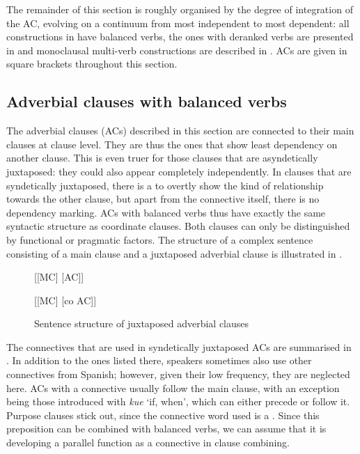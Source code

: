 The remainder of this section is roughly organised by the degree of integration of the AC, evolving on a continuum from most independent to most dependent: all constructions in  have balanced verbs, the ones with deranked verbs are presented in  and monoclausal multi-verb constructions are described in . ACs are given in square brackets throughout this section. 

\subsection{Adverbial clauses with balanced verbs}\label{sec:AdverbialJuxtaposition}

The adverbial clauses (ACs) described in this section are connected to their main clauses at clause level. They are thus the ones that show least dependency on another clause. This is even truer for those clauses that are asyndetically juxtaposed: they could also appear completely independently. In clauses that are syndetically juxtaposed, there is a  to overtly show the kind of relationship towards the other clause, but apart from the connective itself, there is no dependency marking. ACs with balanced verbs thus have exactly the same syntactic structure as coordinate clauses. Both clauses can only be distinguished by functional or pragmatic factors. The structure of a complex sentence consisting of a main clause and a juxtaposed adverbial clause is illustrated in . 

\begin{figure}[!ht]


[[MC] [AC]]

[[MC] [co AC]]
\caption{Sentence structure of juxtaposed adverbial clauses}
\label{fig:JuxtaposedACStructure}

\end{figure}


The connectives that are used in syndetically juxtaposed ACs are summarised in . In addition to the ones listed there, speakers sometimes also use other connectives from Spanish; however, given their low frequency, they are neglected here. ACs with a connective usually follow the main clause, with an exception being those introduced with \textit{kue} ‘if, when’, which can either precede or follow it. Purpose clauses stick out, since the connective word used is a . Since this preposition can be combined with balanced verbs, we can assume that it is developing a parallel function as a connective in clause combining.

